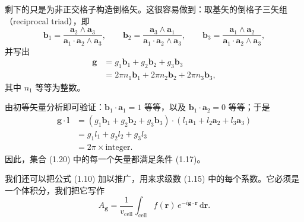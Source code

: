 剩下的只是为非正交格子构造倒格矢。这很容易做到：取基矢的倒格子三矢组（reciprocal triad），即
\begin{equation*}
\mathbf{b}_1 = \frac{\mathbf{a}_2\wedge\mathbf{a}_3}{\mathbf{a}_1\cdot\mathbf{a}_2\wedge\mathbf{a}_3}, \qquad
\mathbf{b}_2 = \frac{\mathbf{a}_3\wedge\mathbf{a}_1}{\mathbf{a}_1\cdot\mathbf{a}_2\wedge\mathbf{a}_3}, \qquad
\mathbf{b}_3 = \frac{\mathbf{a}_1\wedge\mathbf{a}_2}{\mathbf{a}_1\cdot\mathbf{a}_2\wedge\mathbf{a}_3},
\tag{1.19}
\end{equation*}
并写出
\begin{align*}
\boldsymbol{g} &= g_1\mathbf{b}_1 + g_2\mathbf{b}_2 + g_3\mathbf{b}_3 \\
&= 2\pi n_1\mathbf{b}_1 + 2\pi n_2\mathbf{b}_2 + 2\pi n_3\mathbf{b}_3,
\tag{1.20}
\end{align*}
其中 $n_1$ 等等为整数。

由初等矢量分析即可验证：$\mathbf{b}_1\cdot\mathbf{a}_1 = 1$ 等等，以及 $\mathbf{b}_1\cdot\mathbf{a}_2 = 0$ 等等；于是
\begin{align*}
\boldsymbol{g}\cdot\boldsymbol{l} &= \left(g_1\mathbf{b}_1 + g_2\mathbf{b}_2 + g_3\mathbf{b}_3\right)\cdot\left(l_1\mathbf{a}_1 + l_2\mathbf{a}_2 + l_3\mathbf{a}_3\right) \\
&= g_1 l_1 + g_2 l_2 + g_3 l_3 \\
&= 2\pi \times \text{integer}.
\tag{1.21}
\end{align*}
因此，集合 (1.20) 中的每一个矢量都满足条件 (1.17)。

我们还可以把公式 (1.10) 加以推广，用来求级数 (1.15) 中的每个系数。它必须是一个体积分，我们把它写作
\begin{equation*}
A_{\boldsymbol{g}} = \frac{1}{v_{\text{cell}}} \int_{\text{cell}} f(\mathbf{r})\, e^{-i\boldsymbol{g}\cdot\mathbf{r}}\,\mathrm{d}\mathbf{r}.
\tag{1.22}
\end{equation*}
